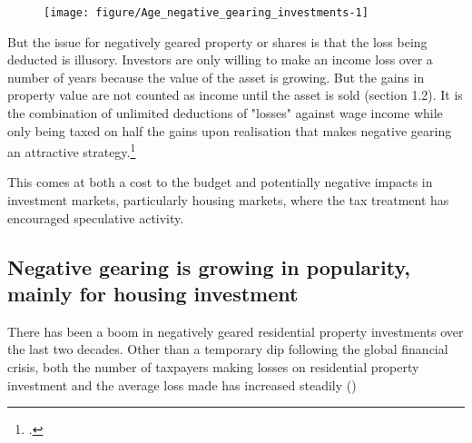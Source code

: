 \documentclass{grattan}\usepackage[]{graphicx}\usepackage[]{color}
\newcommand\gao{Grattan analysis of}
\begin{document}
\begin{figure}
\texttt{[image: figure/Age\_negative\_gearing\_investments-1]}

\source{\gao\ \textcite{ATO2013i}}
\end{figure}

But the issue for negatively geared property or shares is that the loss being deducted is illusory. Investors are only willing to make an income loss over a number of years because the value of the asset is growing. But the gains in property value are not counted as income until the asset is sold (section 1.2). It is the combination of unlimited deductions of "losses" against wage income while only being taxed on half the gains upon realisation that makes negative gearing an attractive strategy.\footcite[pages~5,13]{ACOSS} 

This comes at both a cost to the budget and potentially negative impacts in investment markets, particularly housing markets, where the tax treatment has encouraged speculative activity. 

\subsection{Negative gearing is growing in popularity, mainly for housing investment}
There has been a boom in negatively geared residential property investments over the last two decades. Other than a temporary dip following the global financial crisis, both the number of taxpayers making losses on residential property investment and the average loss made has increased steadily ()
\end{document}
